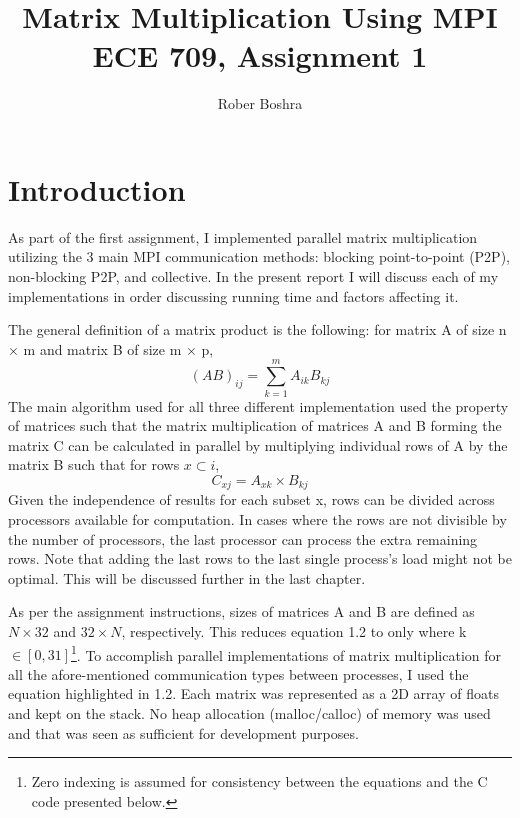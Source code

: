 \documentclass[12pt]{report}
\author{Rober Boshra}
\title{Matrix Multiplication Using MPI\\ECE 709, Assignment 1}
\begin{document}
 

\maketitle
\tableofcontents

\chapter{Introduction}
As part of the first assignment, I implemented parallel matrix multiplication utilizing the 3 main MPI communication methods: blocking point-to-point (P2P), non-blocking P2P, and collective. In the present report I will discuss each of my implementations in order discussing running time and factors affecting it.

The general definition of a matrix product is the following: for matrix A of size n $\times$ m and matrix B of size m $\times$ p, 
\begin{equation}
(AB)_{ij}=\sum\limits_{k=1}^m A_{ik}B_{kj}
\end{equation}
The main algorithm used for all three different implementation used the property of matrices such that the matrix multiplication of matrices A and B forming the matrix C can be calculated in parallel by multiplying individual rows of A by the matrix B such that for rows $x \subset i$,
\begin{equation}
C_{xj} = A_{xk} \times B_{kj}
\end{equation}
Given the independence of results for each subset x, rows can be divided across processors available for computation. In cases where the rows are not divisible by the number of processors, the last processor can process the extra remaining rows. Note that adding the last rows to the last single process's load might not be optimal. This will be discussed further in the last chapter. 

As per the assignment instructions, sizes of matrices A and B are defined as $N \times 32$ and $32 \times N$, respectively. This reduces equation 1.2 to only where k $\in [0,31]$\footnote{\label{^1}Zero indexing is assumed for consistency between the equations and the C code presented below.}. To accomplish parallel implementations of matrix multiplication for all the afore-mentioned communication types between processes, I used the equation highlighted in 1.2. Each matrix was represented as a 2D array of floats and kept on the stack. No heap allocation (malloc/calloc) of memory was used and that was seen as sufficient for development purposes.
\end{document}
